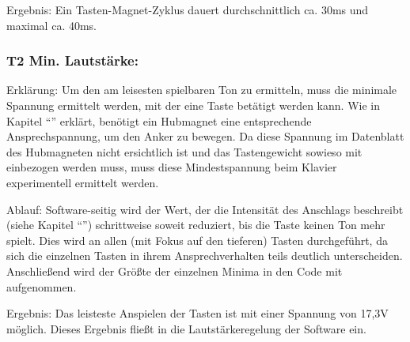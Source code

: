 Ergebnis: Ein Tasten-Magnet-Zyklus dauert durchschnittlich ca. 30ms und maximal ca. 40ms.

\subsubsection{T2 Min. Lautstärke:}

Erklärung: Um den am leisesten spielbaren Ton zu ermitteln, muss die minimale Spannung ermittelt werden, mit der eine Taste betätigt werden kann.
Wie in Kapitel \enquote{} erklärt, benötigt ein Hubmagnet eine entsprechende Ansprechspannung, um den Anker zu bewegen.
Da diese Spannung im Datenblatt des Hubmagneten nicht ersichtlich ist und das Tastengewicht sowieso mit einbezogen werden muss, muss diese Mindestspannung beim Klavier experimentell ermittelt werden.

Ablauf: Software-seitig wird der Wert, der die Intensität des Anschlags beschreibt (siehe Kapitel \enquote{}) schrittweise soweit reduziert, bis die Taste keinen Ton mehr spielt.
Dies wird an allen (mit Fokus auf den tieferen) Tasten durchgeführt, da sich die einzelnen Tasten in ihrem Ansprechverhalten teils deutlich unterscheiden. %
Anschließend wird der Größte der einzelnen Minima in den Code mit aufgenommen.

Ergebnis: Das leisteste Anspielen der Tasten ist mit einer Spannung von 17,3V möglich.
Dieses Ergebnis fließt in die Lautstärkeregelung der Software ein.
